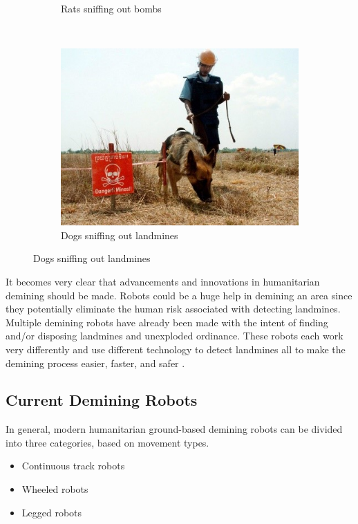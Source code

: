 \begin{figure} [H]
\begin{subfigure}[b]{0.28\textwidth}
        \caption{Rats sniffing out bombs}
        \label{fig:rat_finding_mines}
    \end{subfigure}
    ~ %
    \begin{subfigure}[b]{0.28\textwidth}
        \includegraphics[width=\textwidth]{00 - Images/dog_finding_mines.jpg}
        \caption{Dogs sniffing out landmines}
        \label{fig:dog_finding_mines}
    \end{subfigure}
\end{figure}

It becomes very clear that advancements and innovations in humanitarian demining should be made. Robots could be a huge help in demining an area since they potentially eliminate the human risk associated with detecting landmines. Multiple demining robots have already been made with the intent of finding and/or disposing landmines and unexploded ordinance. These robots each work very differently and use different technology to detect landmines all to make the demining process easier, faster, and safer \cite{MotionPlanningRobot2011}.

\subsection{Current Demining Robots}

In general, modern humanitarian ground-based demining robots can be divided into three categories, based on movement types.
\begin{itemize}
\setlength{\itemsep}{0.05\baselineskip}
	\item Continuous track robots
	\item Wheeled robots
	\item Legged robots
\end{itemize}

